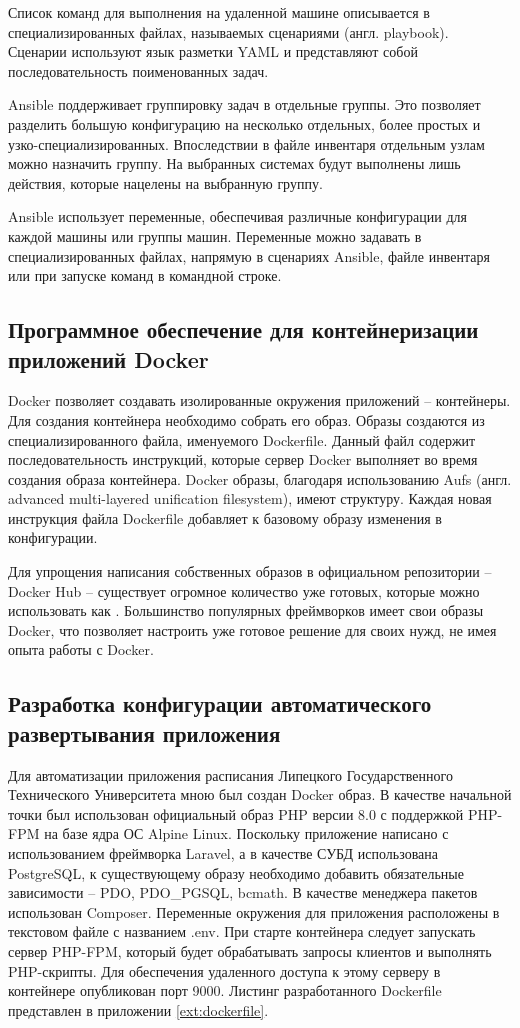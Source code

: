 Список команд для выполнения на удаленной машине описывается в
специализированных файлах, называемых сценариями (англ. playbook). Сценарии
используют язык разметки YAML и представляют собой последовательность
поименованных задач.

Ansible поддерживает группировку задач в отдельные группы.
Это позволяет разделить большую конфигурацию на несколько отдельных, более
простых и узко-специализированных. Впоследствии в файле инвентаря отдельным
узлам можно назначить группу. На выбранных системах будут выполнены лишь
действия, которые нацелены на выбранную группу.

Ansible использует переменные, обеспечивая различные конфигурации для каждой
машины или группы машин. Переменные можно задавать в специализированных файлах,
напрямую в сценариях Ansible, файле инвентаря или при запуске команд в командной
строке.


\subsection{Программное обеспечение для контейнеризации приложений Docker}
Docker позволяет создавать изолированные окружения приложений -- контейнеры. Для
создания контейнера необходимо собрать его образ. Образы создаются из
специализированного файла, именуемого Dockerfile. Данный файл содержит
последовательность инструкций, которые сервер Docker выполняет во время создания
образа контейнера. Docker образы, благодаря использованию Aufs (англ. advanced
multi-layered unification filesystem), имеют  структуру.
Каждая новая инструкция файла Dockerfile добавляет к базовому образу изменения в
конфигурации.

Для упрощения написания собственных образов в официальном репозитории -- Docker
Hub -- существует огромное количество уже готовых, которые можно
использовать как . Большинство популярных
фреймворков имеет свои образы Docker, что позволяет настроить уже готовое
решение для своих нужд, не имея опыта работы с Docker.

\subsection{Разработка конфигурации автоматического развертывания приложения}
Для автоматизации приложения расписания Липецкого Государственного Технического
Университета мною был создан Docker образ. В качестве начальной точки был
использован официальный образ PHP версии 8.0 с поддержкой PHP-FPM на базе ядра
ОС Alpine Linux. Поскольку приложение написано с использованием фреймворка
Laravel, а в качестве СУБД использована PostgreSQL, к существующему образу
необходимо добавить обязательные зависимости -- PDO, PDO\_PGSQL, bcmath. В
качестве менеджера пакетов использован Composer. Переменные окружения для
приложения расположены в текстовом файле с названием .env. При старте контейнера
следует запускать сервер PHP-FPM, который будет обрабатывать запросы клиентов и
выполнять PHP-скрипты. Для обеспечения удаленного доступа к этому серверу в
контейнере опубликован порт 9000. Листинг разработанного Dockerfile представлен
в приложении \ref{ext:dockerfile}.

